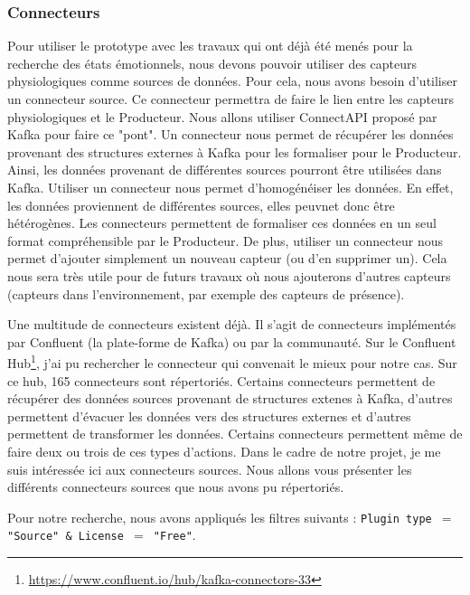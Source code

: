 \documentclass[11pt]{article}
\begin{document}
		\subsubsection{Connecteurs}\label{sec:connecteurs}
			Pour utiliser le prototype avec les travaux qui ont déjà été menés pour la recherche des états émotionnels, nous devons pouvoir utiliser des capteurs physiologiques comme sources de données.
			Pour cela, nous avons besoin d'utiliser un connecteur source.
			Ce connecteur permettra de faire le lien entre les capteurs physiologiques et le Producteur.
			Nous allons utiliser ConnectAPI proposé par Kafka pour faire ce "pont".
			Un connecteur nous permet de récupérer les données provenant des structures externes à Kafka pour les formaliser pour le Producteur.
			Ainsi, les données provenant de différentes sources pourront être utilisées dans Kafka.
			Utiliser un connecteur nous permet d'homogénéiser les données.
			En effet, les données proviennent de différentes sources, elles peuvnet donc être hétérogènes. 
			Les connecteurs permettent de formaliser ces données en un seul format compréhensible par le Producteur.
			De plus, utiliser un connecteur nous permet d'ajouter simplement un nouveau capteur (ou d'en supprimer un).
			Cela nous sera très utile pour de futurs travaux où nous ajouterons d'autres capteurs (capteurs dans l'environnement, par exemple des capteurs de présence).\par
			Une multitude de connecteurs existent déjà. 
			Il s'agit de connecteurs implémentés par Confluent (la plate-forme de Kafka) ou par la communauté.
			Sur le Confluent Hub\footnote{\href{https://www.confluent.io/hub/kafka-connectors-33}{https://www.confluent.io/hub/kafka-connectors-33}}, j'ai pu rechercher le connecteur qui convenait le mieux pour notre cas.
			Sur ce hub, 165 connecteurs sont répertoriés.
			Certains connecteurs permettent de récupérer des données sources provenant de structures extenes à Kafka, d'autres permettent d'évacuer les données vers des structures externes et d'autres permettent de transformer les données.
			Certains connecteurs permettent même de faire deux ou trois de ces types d'actions. 
			Dans le cadre de notre projet, je me suis intéressée ici aux connecteurs sources.
			Nous allons vous présenter les différents connecteurs sources que nous avons pu répertoriés.\par
			Pour notre recherche, nous avons appliqués les filtres suivants : \newline
			\texttt{Plugin type $=$ "Source" \& License $=$ "Free"}.\newline
\end{document}
